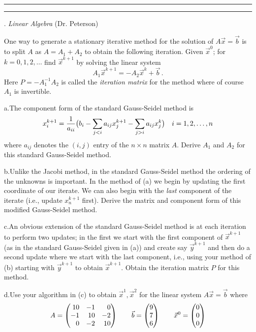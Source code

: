 \documentclass [11point]{article}
\begin{document}
\medskip
\hrule

\pagebreak
\hrule 
{}. \textit{Linear Algebra} (Dr. Peterson)
\bigskip

One way to generate a stationary iterative method for the solution of $A \vec x = \vec b$ is to split $A$ as $A=A_1+A_2$ to obtain the following iteration.
\smallskip
Given $\vec x^0$; for $k=0,1,2,\ldots$ find $\vec x^{k+1}$ by solving the linear system
$$A_1 \vec x^{k+1} = -A_2 \vec x ^k + \vec b \,. $$
Here $P=-A_1^{-1}A_2$ is called the {\it iteration matrix} for the method where of course $A_1$ is invertible.\medskip

a.\quad  The component form of the standard Gauss-Seidel method is
$$ x^{k+1}_i = {1 \over a_{ii} } \big( b_i - \sum_{j<i} a_{ij}x_j^{k+1} - \sum_{j>i} a_{ij}x_j^{k }\big) \quad i=1,2, \ldots, n$$
where $a_{ij}$ denotes the $(i,j)$ entry of the $n \times n$ matrix $A$.  Derive $A_1$ and $A_2$ for this standard Gauss-Seidel method. \medskip

b.\quad Unlike the Jacobi method, in the standard Gauss-Seidel method the ordering of the unknowns is important.  In the method of (a) we begin by updating the   first coordinate of our iterate.  We can also begin with the {\it last} component of the iterate (i.e., update $x_n^{k+1}$ first).  Derive the matrix and component form of this modified Gauss-Seidel method. \medskip

c.\quad    An obvious extension of the standard Gauss-Seidel method is at each iteration to  perform two updates; in the first we start with the first component of $\vec x^{k+1}$ (as in the standard Gauss-Seidel given in (a)) and create say $\vec y^{k+1}$ and then    do a second update where we start  with the last component,  i.e., using your method of (b) starting with $\vec y^{k+1}$ to obtain  $  \vec x^{k+1}$. Obtain the iteration matrix $P$ for this method. \medskip

d.\quad  Use your algorithm in (c) to   obtain $\vec x^1, \vec x^2$ for the linear system $A \vec x = \vec b$ where
$$ A =\begin{pmatrix} \hfill 10 & \hfill  -1 & \hfill  0 \cr  \hfill -1 & \hfill 10 & \hfill -2 \cr  \hfill 0 & \hfill  -2 & \hfill 10 \end{pmatrix}  \qquad \vec b= \begin{pmatrix} 9 \cr 7 \cr 6 \end{pmatrix} \qquad \vec x^0 = \begin{pmatrix} 0\cr 0 \cr 0 \end{pmatrix} $$
\medskip
\end{document}
